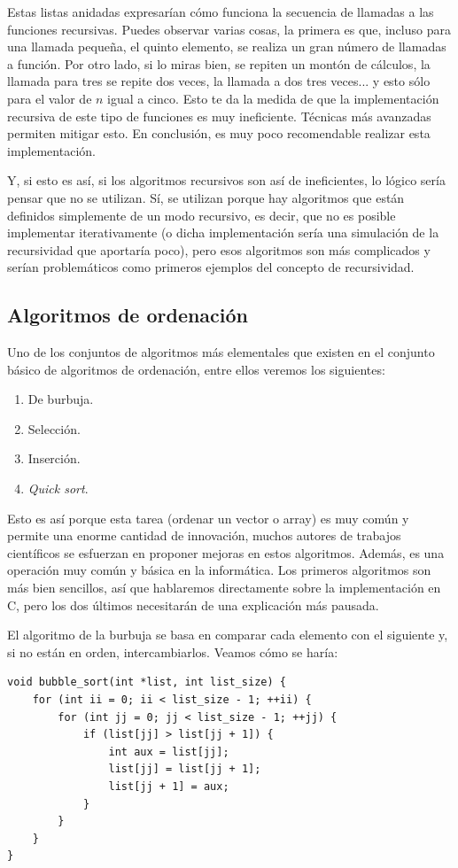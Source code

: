 \documentclass[a4paper]{article}
\begin{document}
Estas listas anidadas expresarían cómo funciona la secuencia de llamadas a las
funciones recursivas. Puedes observar varias cosas, la primera es que, incluso
para una llamada pequeña, el quinto elemento, se realiza un gran número de
llamadas a función. Por otro lado, si lo miras bien, se repiten un montón de
cálculos, la llamada para tres se repite dos veces, la llamada a dos tres
veces... y esto sólo para el valor de $n$ igual a cinco. Esto te da la medida
de que la implementación recursiva de este tipo de funciones es muy ineficiente.
Técnicas más avanzadas permiten mitigar esto. En conclusión, es
muy poco recomendable realizar esta implementación.

Y, si esto es así, si los algoritmos recursivos son así de ineficientes, lo
lógico sería pensar que no se utilizan. Sí, se utilizan porque hay algoritmos
que están definidos simplemente de un modo recursivo, es decir, que no es
posible implementar iterativamente (o dicha implementación sería una
simulación de la recursividad que aportaría poco), pero esos algoritmos son más
complicados y serían problemáticos como primeros ejemplos del concepto de
recursividad.

\subsection{Algoritmos de ordenación}
Uno de los conjuntos de algoritmos más elementales que existen en el conjunto
básico de algoritmos de ordenación, entre ellos veremos los siguientes:
\begin{enumerate}
\item De burbuja.
\item Selección.
\item Inserción.
\item \textit{Quick sort}.
\end{enumerate}
Esto es así porque esta tarea (ordenar un vector o array) es muy común y permite
una enorme cantidad de innovación, muchos autores de trabajos científicos se
esfuerzan en proponer mejoras en estos algoritmos. Además, es una operación
muy común y básica en la informática. Los primeros algoritmos son más bien
sencillos, así que hablaremos directamente sobre la implementación en C, pero
los dos últimos necesitarán de una explicación más pausada.

El algoritmo de la burbuja se basa en comparar cada elemento con el siguiente
y, si no están en orden, intercambiarlos. Veamos cómo se haría:

\noindent
\begin{minipage}[H]{\linewidth}
\mbox{}
\begin{lstlisting}[style=C,
caption={Implementación del algoritmo de la burbuja},
label={lst:bubbleSort}]
void bubble_sort(int *list, int list_size) {
    for (int ii = 0; ii < list_size - 1; ++ii) {
        for (int jj = 0; jj < list_size - 1; ++jj) {
            if (list[jj] > list[jj + 1]) {
                int aux = list[jj];
                list[jj] = list[jj + 1];
                list[jj + 1] = aux;
            }
        }
    }
}
\end{lstlisting}
\end{minipage}
\end{document}
